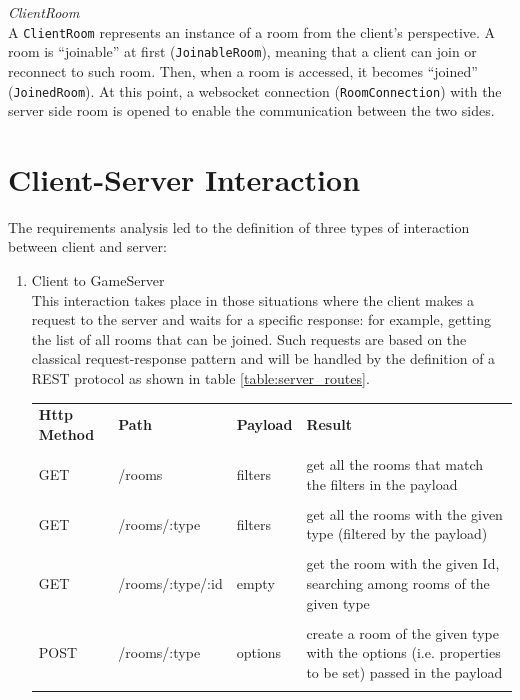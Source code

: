 \bigskip
\textit{ClientRoom}
\\
A \texttt{ClientRoom} represents an instance of a room from the client's perspective. A room is ``joinable'' at first  (\texttt{JoinableRoom}), meaning that a client can join or reconnect to such room. 
Then, when a room is accessed, it becomes ``joined'' (\texttt{JoinedRoom}). At this point, a websocket connection (\texttt{RoomConnection}) with the server side room is opened to enable the communication between the two sides.


\section{Client-Server Interaction}
The requirements analysis led to the definition of three types of interaction between client and server:
\begin{enumerate}
	\item Client to GameServer \\
	This interaction takes place in those situations where the client makes a request to the server and waits for a specific response: for example, getting the list of all rooms that can be joined. Such requests are based on the classical request-response pattern and will be handled by the definition of a REST protocol as shown in table
	 \ref{table:server_routes}.
	\begin{table}[]
		\begin{tabular}{p{2cm}p{4cm}p{2cm}p{5.5cm}}
			\textbf{Http Method} & \textbf{Path}	  & \textbf{Payload}  & \textbf{Result}                                                            		\\\\
			GET                  & /rooms             & filters           & get all the rooms that match the filters in the payload                        	\\\\
			GET                  & /rooms/:type       & filters           & get all the rooms with the given type (filtered by the payload)     	\\\\
			GET                  & /rooms/:type/:id   & empty             & get the room with the given Id, searching among rooms of the given type         	\\\\
			POST                 & /rooms/:type       & options           & create a room of the given type with the options (i.e. properties to be set) passed in the payload          	\\\\

\end{tabular}
\end{table}
\end{enumerate}
